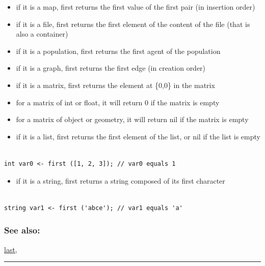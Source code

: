 \documentclass[]{book}
\providecommand{\tightlist}{%
  \setlength{\itemsep}{0pt}\setlength{\parskip}{0pt}}
\theoremstyle{definition}
\theoremstyle{definition}
\theoremstyle{definition}
\theoremstyle{remark}
\begin{document}
\begin{itemize}
\tightlist
\item
  if it is a map, first returns the first value of the first pair (in
  insertion order)\\
\item
  if it is a file, first returns the first element of the content of the
  file (that is also a container)\\
\item
  if it is a population, first returns the first agent of the
  population\\
\item
  if it is a graph, first returns the first edge (in creation order)\\
\item
  if it is a matrix, first returns the element at \{0,0\} in the
  matrix\\
\item
  for a matrix of int or float, it will return 0 if the matrix is
  empty\\
\item
  for a matrix of object or geometry, it will return nil if the matrix
  is empty\\
\item
  if it is a list, first returns the first element of the list, or nil
  if the list is empty
\end{itemize}

\begin{verbatim}
 
int var0 <- first ([1, 2, 3]); // var0 equals 1
\end{verbatim}

\begin{itemize}
\tightlist
\item
  if it is a string, first returns a string composed of its first
  character
\end{itemize}

\begin{verbatim}
 
string var1 <- first ('abce'); // var1 equals 'a'
\end{verbatim}

\subsubsection{See also:}\label{see-also-94}

\href{operators-i-to-m.html\#last}{last},

\begin{center}\rule{0.5\linewidth}{\linethickness}\end{center}
\end{document}
